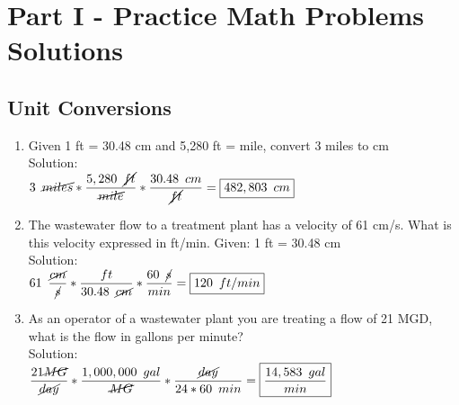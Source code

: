 
\chapter{Part I - Practice Math Problems Solutions}

\section{Unit Conversions}
\begin{enumerate}
\item Given 1 ft = 30.48 cm and 5,280 ft = mile, convert 3 miles to cm\\
Solution:\\
$3 \enspace \cancel{miles} * \dfrac{5,280 \enspace \cancel{ft}}{\cancel{mile}}*\dfrac{30.48 \enspace cm}{\cancel{ft}}=\boxed{482,803 \enspace cm}$

\item The wastewater flow to a treatment plant has a velocity of 61 cm/s. What is this velocity expressed in ft/min. Given: 1 ft = 30.48 cm\\
Solution:\\
$61 \enspace \dfrac{\cancel{cm}}{\cancel{s}} * \dfrac{ft}{30.48 \enspace \cancel{cm}}* \dfrac{60 \enspace \cancel{s}}{min} =  \boxed{120 \enspace ft/min}$\\

\item As an operator of a wastewater plant you are treating a flow of 21 MGD, what is the flow in gallons per minute?\\
Solution:\\
$\dfrac{21 \cancel{MG}}{\cancel{day}}*\dfrac{1,000,000 \enspace gal}{\cancel{MG}}*\dfrac{\cancel{day}}{24*60 \enspace min}=\boxed{\dfrac{14,583 \enspace gal}{min}}$\\
\end{enumerate}

\newpage

